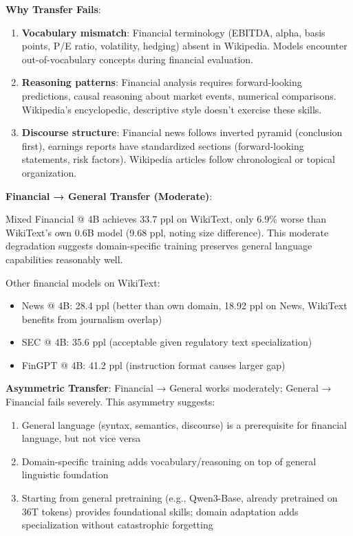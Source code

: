 \textbf{Why Transfer Fails}:
\begin{enumerate}
\item \textbf{Vocabulary mismatch}: Financial terminology (EBITDA, alpha, basis points, P/E ratio, volatility, hedging) absent in Wikipedia. Models encounter out-of-vocabulary concepts during financial evaluation.
\item \textbf{Reasoning patterns}: Financial analysis requires forward-looking predictions, causal reasoning about market events, numerical comparisons. Wikipedia's encyclopedic, descriptive style doesn't exercise these skills.
\item \textbf{Discourse structure}: Financial news follows inverted pyramid (conclusion first), earnings reports have standardized sections (forward-looking statements, risk factors). Wikipedia articles follow chronological or topical organization.
\end{enumerate}

\textbf{Financial → General Transfer (Moderate)}:

Mixed Financial @ 4B achieves 33.7 ppl on WikiText, only 6.9\% worse than WikiText's own 0.6B model (9.68 ppl, noting size difference). This moderate degradation suggests domain-specific training preserves general language capabilities reasonably well.

Other financial models on WikiText:
\begin{itemize}
\item News @ 4B: 28.4 ppl (better than own domain, 18.92 ppl on News, WikiText benefits from journalism overlap)
\item SEC @ 4B: 35.6 ppl (acceptable given regulatory text specialization)
\item FinGPT @ 4B: 41.2 ppl (instruction format causes larger gap)
\end{itemize}

\textbf{Asymmetric Transfer}: Financial → General works moderately; General → Financial fails severely. This asymmetry suggests:
\begin{enumerate}
\item General language (syntax, semantics, discourse) is a prerequisite for financial language, but not vice versa
\item Domain-specific training adds vocabulary/reasoning on top of general linguistic foundation
\item Starting from general pretraining (e.g., Qwen3-Base, already pretrained on 36T tokens) provides foundational skills; domain adaptation adds specialization without catastrophic forgetting
\end{enumerate}


